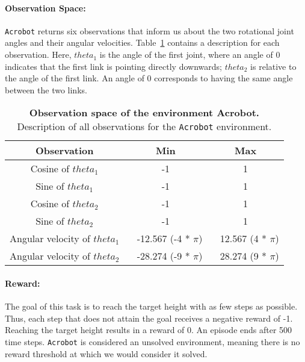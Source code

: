 \paragraph*{Observation Space:} \verb|Acrobot| returns six observations that inform us about the two rotational joint angles and their angular velocities. Table~\ref{table:acrobot_obs} contains a description for each observation. Here, $theta_1$ is the angle of the first joint, where an angle of 0 indicates that the first link is pointing directly downwards; $theta_2$ is relative to the angle of the first link. An angle of 0 corresponds to having the same angle between the two links.
\begin{table}[!ht]
  \centering
  \begin{tabular}{ |c|c|c| }
    \hline
    Observation & Min & Max \\
    \hline
    Cosine of $theta_1$ & -1 & 1 \\
    Sine of $theta_1$ & -1 & 1 \\
    Cosine of $theta_2$ & -1 & 1 \\
    Sine of $theta_2$ & -1 & 1 \\
    Angular velocity of $theta_1$ & ~ -12.567 (-4 * $\pi$) & ~ 12.567 (4 * $\pi$) \\
    Angular velocity of $theta_2$ & ~ -28.274 (-9 * $\pi$) & ~ 28.274 (9 * $\pi$) \\
    \hline
  \end{tabular}
  \caption[Observation space of the environment Acrobot]{
    \textbf{Observation space of the environment Acrobot.}
    Description of all observations for the \texttt{Acrobot} environment.
  }
  \label{table:acrobot_obs}
\end{table}

\paragraph*{Reward:} The goal of this task is to reach the target height with as few steps as possible. Thus, each step that does not attain the goal receives a negative reward of -1. Reaching the target height results in a reward of 0. An episode ends after 500 time steps. \verb|Acrobot| is considered an unsolved environment, meaning there is no reward threshold at which we would consider it solved.

